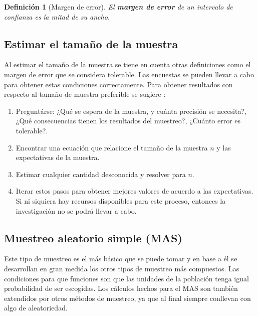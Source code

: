 \documentclass{report}
\newtheorem{definition}{Definición}
\begin{document}
\begin{definition}[Margen de error]
    El \textbf{margen de error} de un intervalo de confianza es la mitad de su ancho.
\end{definition}

\subsection{Estimar el tamaño de la muestra}

Al estimar el tamaño de la muestra se tiene en cuenta otras definiciones como el margen de error que se considera tolerable. Las encuestas se pueden llevar a cabo para obtener estas condiciones correctamente. Para obtener resultados con respecto al tamaño de muestra preferible se sugiere \cite{lohr-2009}:

\begin{enumerate}
    \item Preguntárse: ¿Qué se espera de la muestra, y cuánta precisión se necesita?, ¿Qué consecuencias tienen los resultados del muestreo?, ¿Cuánto error es tolerable?.
    
    \item Encontrar una ecuación que relacione el tamaño de la muestra $n$ y las expectativas de la muestra.
    
    \item Estimar cualquier cantidad desconocida y resolver para $n$.
    
    \item Iterar estos pasos para obtener mejores valores de acuerdo a las expectativas. Si ni siquiera hay recursos disponibles para este proceso, entonces la investigación no se podrá llevar a cabo.
\end{enumerate}

\subsection{Muestreo aleatorio simple (MAS)}

Este tipo de muestreo es el más básico que se puede tomar y en base a él se desarrollan en gran medida los otros tipos de muestreo más compuestos. Las condiciones para que funciones son que las unidades de la población tenga igual probabilidad de ser escogidas. Los cálculos hechos para el MAS son también extendidos por otros métodos de muestreo, ya que al final siempre conllevan con algo de aleatoriedad. 

\bigbreak
\end{document}
